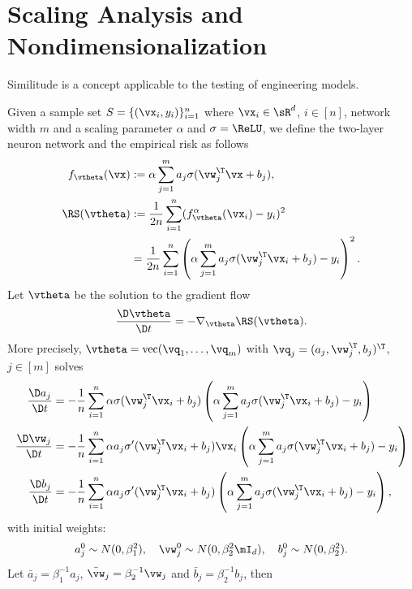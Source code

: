 \documentclass{article}
\begin{document}
\section{Scaling Analysis and Nondimensionalization}
Similitude is a concept applicable to the testing of engineering models.


Given a sample set $S=\{(\vx_i,y_i)\}_{i=1}^n$ where $\vx_i\in\sR^d$, $i\in[n]$, network width $m$ and a scaling parameter $\alpha$ and $\sigma=\ReLU$, we define the two-layer neuron network and the empirical risk as follows
\begin{align}
    f_{\vtheta}(\vx)
     & := \alpha\sum_{j=1}^{m}a_j\sigma(\vw_j^\T\vx+b_j),                                            \\
    \RS(\vtheta)
     & :=\frac{1}{2n}\sum_{i=1}^n(f_{\vtheta}^\alpha(\vx_i)-y_i)^2                                   \\
     & =\frac{1}{2n}\sum_{i=1}^n\left(\alpha\sum_{j=1}^{m}a_j\sigma(\vw_j^\T\vx_i+b_j)-y_i\right)^2.
\end{align}
Let $\vtheta$ be the solution to the gradient flow
\begin{equation}
    \frac{\D \vtheta}{\D t}=-\nabla_{\vtheta}\RS(\vtheta).
\end{equation}
More precisely, $\vtheta=\mathrm{vec}(\vq_1,\ldots,\vq_m)$ with $\vq_j=(a_j,\vw_j^{\T},b_j)^\T$, $j\in[m]$ solves
\begin{align*}
    \frac{\D a_j}{\D t}
     & = -\frac{1}{n}\sum_{i=1}^n\alpha\sigma(\vw_j^{\T}\vx_i+b_j) \left(\alpha\sum_{j=1}^{m}a_j\sigma(\vw_j^{\T}\vx_i+b_j)-y_i\right)           \\
    \frac{\D \vw_j}{\D t}
     & = -\frac{1}{n}\sum_{i=1}^n\alpha a_j\sigma'(\vw_j^{\T}\vx_i+b_j)\vx_i \left(\alpha\sum_{j=1}^{m}a_j\sigma(\vw_j^{\T}\vx_i+b_j)-y_i\right) \\
    \frac{\D b_j}{\D t}
     & = -\frac{1}{n}\sum_{i=1}^n\alpha a_j\sigma'(\vw_j^{\T}\vx_i+b_j) \left(\alpha\sum_{j=1}^{m}a_j\sigma(\vw_j^{\T}\vx_i+b_j)-y_i\right),
\end{align*}
with initial weights:
\begin{equation}
    a_j^0\sim N(0, \beta_1^2), \quad \vw_j^0\sim N(0, \beta_2^2 \mI_d), \quad b_j^0\sim N(0, \beta_2^2).
\end{equation}
Let $\bar{a}_j=\beta_1^{-1}a_j$, $\bar{\vw}_j=\beta_2^{-1}\vw_j$ and $\bar{b}_j=\beta_2^{-1}b_j$, then
\end{document}
